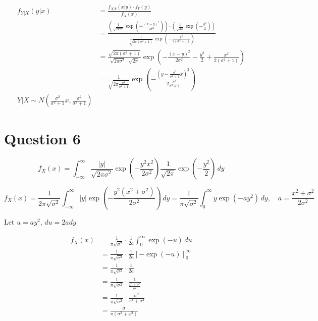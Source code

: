 \documentclass{article}
\begin{document}
\begin{align*}
    f_{Y|X}(y|x) &= \frac{f_{X|Y}(x|y) \cdot f_Y(y)}{f_X(x)} \\
    &= \frac{\left(\frac{1}{\sqrt{2\pi \sigma^2}} \exp\left(-\frac{(x - y)^2}{2\sigma^2}\right)\right) \cdot \left(\frac{1}{\sqrt{2\pi}} \exp\left(-\frac{y^2}{2}\right)\right)}{\frac{1}{\sqrt{2\pi (\sigma^2 + 1)}} \exp\left(-\frac{x^2}{2(\sigma^2 + 1)}\right)} \\
    &= \frac{\sqrt{2\pi (\sigma^2 + 1)}}{\sqrt{2\pi \sigma^2} \cdot \sqrt{2\pi}} \exp\left(-\frac{(x - y)^2}{2\sigma^2} - \frac{y^2}{2} + \frac{x^2}{2(\sigma^2 + 1)}\right) \\
    &= \frac{1}{\sqrt{2\pi \frac{\sigma^2}{\sigma^2 + 1}}} \exp\left(-\frac{\left(y - \frac{\sigma^2}{\sigma^2 + 1} x\right)^2}{2 \frac{\sigma^2}{\sigma^2 + 1}}\right) \\
    Y | X \sim N\left(\frac{\sigma^2}{\sigma^2 + 1} x, \frac{\sigma^2}{\sigma^2 + 1}\right)
\end{align*}

\section*{Question 6}

\[
f_X(x) = \int_{-\infty}^{\infty} \frac{|y|}{\sqrt{2 \pi \sigma^2}} \exp\left(-\frac{y^2 x^2}{2 \sigma^2}\right) \frac{1}{\sqrt{2 \pi}} \exp\left(-\frac{y^2}{2}\right) \, dy
\]


\[
f_X(x) = \frac{1}{2 \pi \sqrt{\sigma^2}} \int_{-\infty}^{\infty} |y| \exp\left(-\frac{y^2 (x^2 + \sigma^2)}{2 \sigma^2}\right) \, dy
=\frac{1}{\pi \sqrt{\sigma^2}} \int_{0}^{\infty} y \exp(-a y^2) \, dy, \quad a = \frac{x^2 + \sigma^2}{2 \sigma^2}
\]

Let \( u = a y^2 \), \(du=2ady\)

\begin{align*}
    f_X(x) &= \frac{1}{\pi \sqrt{\sigma^2}} \cdot \frac{1}{2a} \int_{0}^{\infty} \exp(-u) \, du \\ 
    &= \frac{1}{\pi \sqrt{\sigma^2}} \cdot \frac{1}{2a} [-\exp(-u)]_{0}^{\infty}\\ 
    &= \frac{1}{\pi \sqrt{\sigma^2}} \cdot \frac{1}{2a}\\
    &= \frac{1}{\pi \sqrt{\sigma^2}} \cdot \frac{1}{\frac{x^2 + \sigma^2}{ \sigma^2}}\\
    &= \frac{1}{\pi \sqrt{\sigma^2}} \cdot \frac{\sigma^2}{x^2 + \sigma^2}\\
    &= \frac{\sigma}{\pi (\sigma^2 + x^2)} \\
\end{align*}
\end{document}

